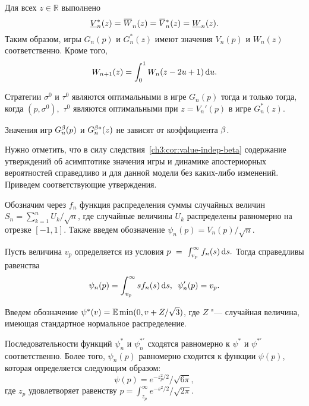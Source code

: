 {\begin{theorem}
  Для всех $z \in \mathbb{R}$ выполнено
  \begin{equation}\label{ch3:eq:duality-relationships}
    \LV[*]{n}(z) = \HW{n}(z) = \HV[*]{n}(z) = \LW{n}(z).
  \end{equation}
  Таким образом, игры $G_n(p)$ и $G_n^*(z)$ имеют значения $V_n(p)$ и $W_n(z)$ соответственно.
  Кроме того,
  \begin{equation}\label{ch3:eq:W-recursive}
    W_{n+1}(z) = \int_0^1 W_n(z - 2u + 1) \mathop{}\!\mathrm{d} u.
  \end{equation}
\end{theorem}

\begin{theorem}\label{ch3:thm:optimal-strategies}
  Стратегии $\sigma^0$ и $\tau^0$ являются оптимальными в игре $G_n(p)$ тогда и только тогда, когда $(p, \sigma^0),$ $\tau^0$ являются оптимальными при $z = V_n'(p)$ в игре $G_n^*(z)$.
\end{theorem}

\begin{corollary}
  \label{ch3:cor:value-indep-beta}
  Значения игр $G^{\beta}_n(p)$ и $G^{\beta*}_n(z)$ не зависят от коэффициента $\beta$.
\end{corollary}

Нужно отметить, что в силу следствия~\ref{ch3:cor:value-indep-beta} содержание утверждений об асимптотике значения игры и динамике апостериорных вероятностей справедливо и для данной модели без каких-либо изменений.
Приведем соответствующие утверждения.

Обозначим через $f_n$ функция распределения суммы случайных величин $S_n = \sum_{k=1}^n U_k / \sqrt{n}$, где случайные величины $U_k$ распределены равномерно на отрезке $[-1, 1]$.
Также введем обозначение $\psi_n(p) = V_n(p)/\sqrt{n}$.

\begin{proposition}
Пусть величина $v_p$ определяется из условия 
$
  p~=~\int_{v_p}^\infty f_n(s) \mathop{}\!\mathrm{d} s.
$
Тогда справедливы равенства
\begin{equation*}
  \psi_n(p) = \int_{v_p}^\infty s f_n(s) \mathop{}\!\mathrm{d} s, \enskip
  \psi'_n(p) = v_p.
\end{equation*}
\end{proposition}

Введем обозначение $\psi^*(v) = \operatorname{\mathbb{E}} \min(0, v + Z/\sqrt{3})$, где $Z$ "--- случайная величина, имеющая стандартное нормальное распределение.

\begin{proposition}
Последовательности функций $\psi^*_n$ и $\psi^{*\prime}_n$ сходятся равномерно к $\psi^*$ и $\psi^{*\prime}$ соответственно.
Более того, $\psi_n(p)$ равномерно сходится к функции $\psi(p)$, которая определяется следующим образом:
\begin{equation*}
  \psi(p) = e^{-z_p^2/2}/\sqrt{6\pi},
\end{equation*}
где $z_p$ удовлетворяет равенству $p = \int_{z_p}^\infty e^{-s^2/2}/\sqrt{2\pi}$.
\end{proposition}

}
